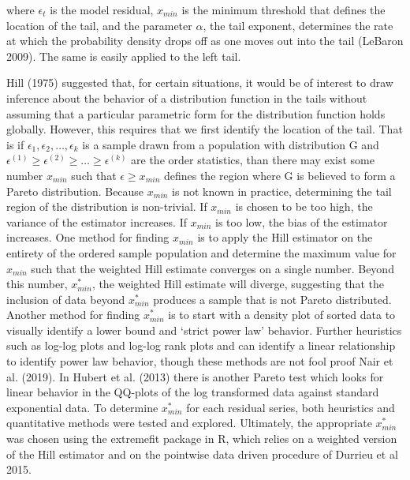 \documentclass[11pt,a4paper,oldfontcommands]{memoir}
\begin{document}
{\begin{flushleft}

where $\epsilon_t$ is the model residual, $x_{min}$ is the minimum threshold that defines the location of the tail, and the parameter $\alpha$, the tail exponent, determines the rate at which the probability density drops off as one moves out into the tail (LeBaron 2009). The same is easily applied to the left tail. 
\end{flushleft}

Hill (1975) suggested that, for certain situations, it would be of interest to draw inference about the behavior of a distribution function in the tails without assuming that a particular parametric form for the distribution function holds globally. However, this requires that we first identify the location of the tail. That is if $\epsilon_1, \epsilon_2,\dots, \epsilon_k$ is a sample drawn from a population with distribution G and $\epsilon^{(1)} \ge  \epsilon^{(2)} \ge \dots \ge \epsilon^{(k)}$ are the order statistics, than there may exist some number $x_{min}$ such that $\epsilon\ge x_{min}$ defines the region where G is believed to form a Pareto distribution. Because $x_{min}$ is not known in practice, determining the tail region of the distribution is non-trivial. If $x_{min}$ is chosen to be too high, the variance of the estimator increases. If $x_{min}$ is too low, the bias of the estimator increases. One method for finding $x_{min}$ is to apply the Hill estimator on the entirety of the ordered sample population and determine the maximum value for $x_{min}$ such that the weighted Hill estimate converges on a single number. Beyond this number, $x_{min}^\ast$, the weighted Hill estimate will diverge, suggesting that the inclusion of data beyond $x_{min}^\ast$ produces a sample that is not Pareto distributed. Another method for finding $x_{min}^\ast$ is to start with a density plot of sorted data to visually identify a lower bound and ‘strict power law’ behavior. Further heuristics such as log-log plots and log-log rank plots and can identify a linear relationship to identify power law behavior, though these methods are not fool proof Nair et al. (2019). In Hubert et al. (2013) there is another Pareto test which looks for linear behavior in the QQ-plots of the log transformed data against standard exponential data. To determine $x_{min}^\ast$ for each residual series, both heuristics and quantitative methods were tested and explored. Ultimately, the appropriate $x_{min}^\ast$ was chosen using the extremefit package in R, which relies on a weighted version of the Hill estimator and on the pointwise data driven procedure of Durrieu et al 2015.

}
\end{document}
